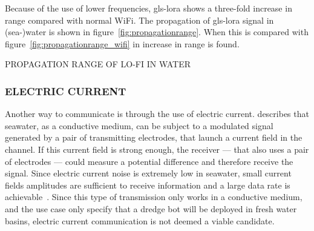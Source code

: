 Because of the use of lower frequencies, \gls{gls-lora} shows a three-fold increase in range compared with normal 
WiFi. The propagation of \gls{gls-lora} signal in (sea-)water is shown in figure~\ref{fig:propagationrange}.
When this is compared with figure~\ref{fig:propagationrange_wifi} in increase in range is found.

\begin{RoyalFigure}[!htb, label=fig:propagationrange]{PROPAGATION RANGE OF LO-FI IN WATER}
\end{RoyalFigure}

\subsubsection{ELECTRIC CURRENT}\label{sec:ec}
Another way to communicate is through the use of electric current. \citet{hagman_elias_design_2009} describes that 
seawater, as a conductive medium, can be subject to a modulated signal generated by a pair of transmitting 
electrodes, that launch a current field in the channel. If this current field is strong enough, the receiver --- that
also uses a pair of electrodes --- could measure a potential difference and therefore receive the signal. Since 
electric current noise is extremely low in seawater, small current fields amplitudes are sufficient to receive 
information and a large data rate is achievable~\cite{hagman_elias_design_2009}.
Since this type of transmission only works in a conductive medium, and the use case only specify that a dredge bot 
will be deployed in fresh water basins, electric current communication is not deemed a viable candidate.

